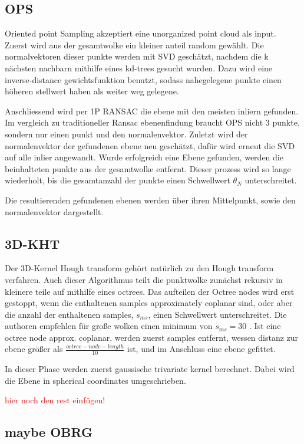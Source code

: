 \documentclass[main.tex]{subfiles}
\begin{document}
\subsection{OPS}
Oriented point Sampling akzeptiert eine unorganized point cloud als input.
Zuerst wird aus der gesamtwolke ein kleiner anteil random gewählt. Die normalvektoren dieser punkte werden mit SVD geschätzt, nachdem die k nächsten nachbarn mithilfe eines kd-trees gesucht wurden.
Dazu wird eine inverse-distance gewichtsfunktion benutzt, sodass nahegelegene punkte einen höheren stellwert haben als weiter weg gelegene.

Anschliessend wird per 1P RANSAC die ebene mit den meisten inliern gefunden. Im vergleich zu traditioneller Ransac ebenenfindung braucht OPS nicht 3 punkte, sondern nur einen punkt und den normalenvektor.
Zuletzt wird der normalenvektor der gefundenen ebene neu geschätzt, dafür wird erneut die SVD auf alle inlier angewandt.
Wurde erfolgreich eine Ebene gefunden, werden die beinhalteten punkte aus der gesamtwolke entfernt. Dieser prozess wird so lange wiederholt, bis die gesamtanzahl der punkte einen Schwellwert $\theta_N$ unterschreitet.

Die resultierenden gefundenen ebenen werden über ihren Mittelpunkt, sowie den normalenvektor dargestellt.

\subsection{3D-KHT}
Der 3D-Kernel Hough transform gehört natürlich zu den Hough transform verfahren.
Auch dieser Algorithmus teilt die punktwolke zunächst rekursiv in kleinere teile auf mithilfe eines octrees. Das aufteilen der Octree nodes wird erst gestoppt, wenn die enthaltenen samples
approximately coplanar sind, oder aber die anzahl der enthaltenen samples, $s_{ms}$, einen Schwellwert unterschreitet. Die authoren empfehlen für große wolken einen minimum von $s_{ms}=30$ \cite{Limberger_Oliveira_2015}.
Ist eine octree node approx. coplanar, werden zuerst samples entfernt, wessen distanz zur ebene größer als $\frac{octree-node-length}{10}$ ist, und im Anschluss eine ebene gefittet.

In dieser Phase werden zuerst gaussische trivariate kernel berechnet. Dabei wird die Ebene in spherical coordinates umgeschrieben.

\textcolor{red}{hier noch den rest einfügen!}
\subsection{maybe OBRG}
\end{document}
